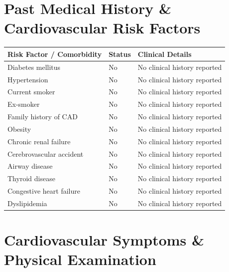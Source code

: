 \documentclass[10pt,a4paper]{article}
\begin{document}
\vspace{8pt}

\section*{Past Medical History \& Cardiovascular Risk Factors}

\begin{tabular}{@{} p{6.8cm} p{2.8cm} p{5.5cm} @{}}
  \toprule
  \textbf{Risk Factor / Comorbidity} & \textbf{Status} & \textbf{Clinical Details} \\
  \midrule
  Diabetes mellitus & No & No clinical history reported \\
  Hypertension & No & No clinical history reported \\
  Current smoker & No & No clinical history reported \\
  Ex-smoker & No & No clinical history reported \\
  Family history of CAD & No & No clinical history reported \\
  Obesity & No & No clinical history reported \\
  Chronic renal failure & No & No clinical history reported \\
  Cerebrovascular accident & No & No clinical history reported \\
  Airway disease & No & No clinical history reported \\
  Thyroid disease & No & No clinical history reported \\
  Congestive heart failure & No & No clinical history reported \\
  Dyslipidemia & No & No clinical history reported \\
  \bottomrule
\end{tabular}

\vspace{8pt}

\section*{Cardiovascular Symptoms \& Physical Examination}
\end{document}
